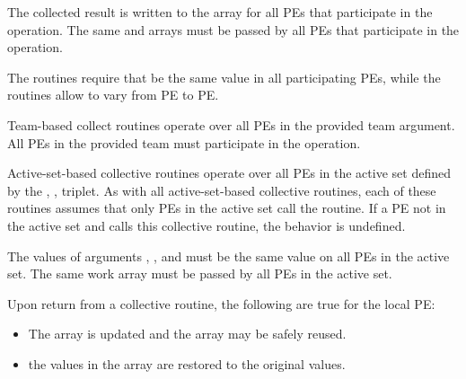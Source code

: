 \begin{apidefinition}
{{    The collected result is written to the \dest{} array for all \acp{PE}
    that participate in the operation. The same \dest{} and \source{}
    arrays must be passed by all \acp{PE} that participate in the operation.
}
    
    The  routines require that  be the same value in all
    participating \acp{PE}, while the  routines allow  to
    vary from \ac{PE} to \ac{PE}.

{\color{Green}
    Team-based collect routines operate over all \acp{PE} in the provided team argument. All
    \acp{PE} in the provided team must participate in the operation.

    Active-set-based collective routines operate over all \acp{PE} in the active set
    defined by the , ,  triplet.
    As with all active-set-based collective routines,
    each of these routines assumes that
    only \acp{PE} in the active set call the routine. If a \ac{PE} not in the
    active set and calls this collective routine, the behavior is undefined.
}
    
    The values of arguments , , and 
    must be the same value on all \acp{PE} in the active set. The same
     work array must be passed by all \acp{PE} in the active set.
    
    Upon return from a collective routine, the following are true for the local
    \ac{PE}:
    \begin{itemize}
    \item The \dest{} array is updated and the \source{} array may be safely reused. 
    \item {} the values in the  array are
    restored to the original values.
    \end{itemize}
}

{\color{Green}


}
\end{apidefinition}
